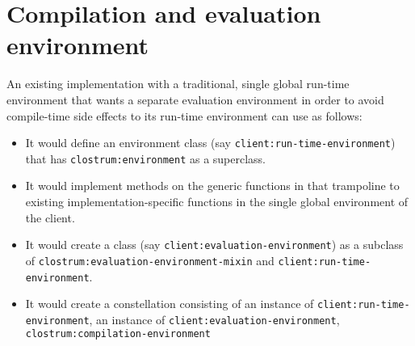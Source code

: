 \section{Compilation and evaluation environment}

An existing \commonlisp{} implementation with a traditional, single
global run-time environment that wants a separate evaluation
environment in order to avoid compile-time side effects to its
run-time environment can use \sysname{} as follows:

\begin{itemize}
\item It would define an environment class  (say
  \texttt{client:run-time-environment}) that has
  \texttt{clostrum:environment} as a superclass.
\item It would implement methods on the generic functions in
   that trampoline to existing
  implementation-specific functions in the single global environment
  of the client.
\item It would create a class (say
  \texttt{client:evaluation-environment}) as a subclass of
  \texttt{clostrum:evaluation-environment-mixin} and
  \texttt{client:run-time-environment}.
\item It would create a constellation consisting of an instance of
  \texttt{client:run-time-environment}, an instance of
  \texttt{client:evaluation-environment},
  \texttt{clostrum:compilation-environment}
\end{itemize}
